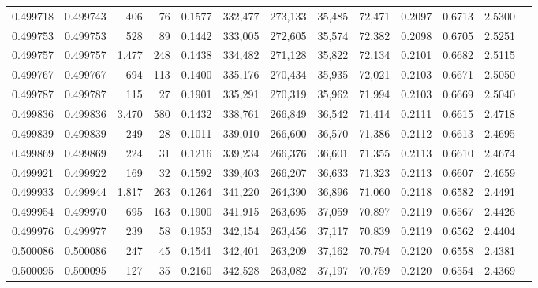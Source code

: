 \begin{tabular}{rrrrrrrrrrrrr}
0.499718 & 0.499743 &   406 &    76 &                                     0.1577 & 332,477 & 273,133 &  35,485 &  72,471 & 0.2097 & 0.6713 & 2.5300 \\
0.499753 & 0.499753 &   528 &    89 &                                     0.1442 & 333,005 & 272,605 &  35,574 &  72,382 & 0.2098 & 0.6705 & 2.5251 \\
0.499757 & 0.499757 & 1,477 &   248 &                                     0.1438 & 334,482 & 271,128 &  35,822 &  72,134 & 0.2101 & 0.6682 & 2.5115 \\
0.499767 & 0.499767 &   694 &   113 &                                     0.1400 & 335,176 & 270,434 &  35,935 &  72,021 & 0.2103 & 0.6671 & 2.5050 \\
0.499787 & 0.499787 &   115 &    27 &                                     0.1901 & 335,291 & 270,319 &  35,962 &  71,994 & 0.2103 & 0.6669 & 2.5040 \\
0.499836 & 0.499836 & 3,470 &   580 &                                     0.1432 & 338,761 & 266,849 &  36,542 &  71,414 & 0.2111 & 0.6615 & 2.4718 \\
0.499839 & 0.499839 &   249 &    28 &                                     0.1011 & 339,010 & 266,600 &  36,570 &  71,386 & 0.2112 & 0.6613 & 2.4695 \\
0.499869 & 0.499869 &   224 &    31 &                                     0.1216 & 339,234 & 266,376 &  36,601 &  71,355 & 0.2113 & 0.6610 & 2.4674 \\
0.499921 & 0.499922 &   169 &    32 &                                     0.1592 & 339,403 & 266,207 &  36,633 &  71,323 & 0.2113 & 0.6607 & 2.4659 \\
0.499933 & 0.499944 & 1,817 &   263 &                                     0.1264 & 341,220 & 264,390 &  36,896 &  71,060 & 0.2118 & 0.6582 & 2.4491 \\
0.499954 & 0.499970 &   695 &   163 &                                     0.1900 & 341,915 & 263,695 &  37,059 &  70,897 & 0.2119 & 0.6567 & 2.4426 \\
0.499976 & 0.499977 &   239 &    58 &                                     0.1953 & 342,154 & 263,456 &  37,117 &  70,839 & 0.2119 & 0.6562 & 2.4404 \\
0.500086 & 0.500086 &   247 &    45 &                                     0.1541 & 342,401 & 263,209 &  37,162 &  70,794 & 0.2120 & 0.6558 & 2.4381 \\
0.500095 & 0.500095 &   127 &    35 &                                     0.2160 & 342,528 & 263,082 &  37,197 &  70,759 & 0.2120 & 0.6554 & 2.4369 \\

\end{tabular}
